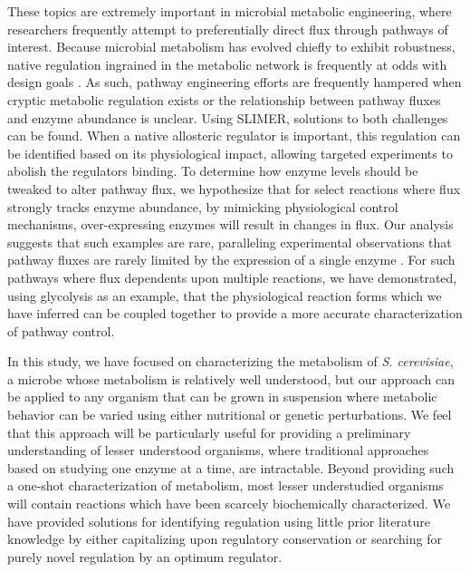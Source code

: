 These topics are extremely important in microbial metabolic engineering, where researchers frequently attempt to preferentially direct flux through pathways of interest.  Because microbial metabolism has evolved chiefly to exhibit robustness, native regulation ingrained in the metabolic network is frequently at odds with design goals \cite{Kitano:2007cp}.  As such, pathway engineering efforts are frequently hampered when cryptic metabolic regulation exists or the relationship between pathway fluxes and enzyme abundance is unclear.  Using SLIMER, solutions to both challenges can be found.  When a native allosteric regulator is important, this regulation can be identified based on its physiological impact, allowing targeted experiments to abolish the regulators binding. To determine how enzyme levels should be tweaked to alter pathway flux, we hypothesize that for select reactions where flux strongly tracks enzyme abundance, by mimicking physiological control mechanisms, over-expressing enzymes will result in changes in flux.  Our analysis suggests that such examples are rare, paralleling experimental observations that pathway fluxes are rarely limited by the expression of a single enzyme \cite{Hauf:2000vu, CornishBowden:1995fy}.  For such pathways where flux dependents upon multiple reactions, we have demonstrated, using glycolysis as an example, that the physiological reaction forms which we have inferred can be coupled together to provide a more accurate characterization of pathway control.

In this study, we have focused on characterizing the metabolism of \textit{S. cerevisiae}, a microbe whose metabolism is relatively well understood, but our approach can be applied to any organism that can be grown in suspension where metabolic behavior can be varied using either nutritional or genetic perturbations.  We feel that this approach will be particularly useful for providing a preliminary understanding of lesser understood organisms, where traditional approaches based on studying one enzyme at a time, are intractable.  Beyond providing such a one-shot characterization of metabolism, most lesser understudied organisms will contain reactions which have been scarcely biochemically characterized.  We have provided solutions for identifying regulation using little prior literature knowledge by either capitalizing upon regulatory conservation or searching for purely novel regulation by an optimum regulator.


